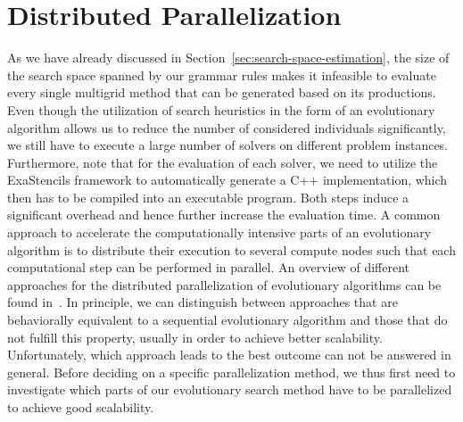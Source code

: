 \section{Distributed Parallelization}
\label{sec:distributed-parallelization}
As we have already discussed in Section~\ref{sec:search-space-estimation}, the size of the search space spanned by our grammar rules makes it infeasible to evaluate every single multigrid method that can be generated based on its productions.
Even though the utilization of search heuristics in the form of an evolutionary algorithm allows us to reduce the number of considered individuals significantly, we still have to execute a large number of solvers on different problem instances.
Furthermore, note that for the evaluation of each solver, we need to utilize the ExaStencils framework to automatically generate a C++ implementation, which then has to be compiled into an executable program.
Both steps induce a significant overhead and hence further increase the evaluation time.
A common approach to accelerate the computationally intensive parts of an evolutionary algorithm is to distribute their execution to several compute nodes such that each computational step can be performed in parallel.
An overview of different approaches for the distributed parallelization of evolutionary algorithms can be found in~\cite{gong2015distributed}.
In principle, we can distinguish between approaches that are behaviorally equivalent to a sequential evolutionary algorithm and those that do not fulfill this property, usually in order to achieve better scalability.
Unfortunately, which approach leads to the best outcome can not be answered in general.
Before deciding on a specific parallelization method, we thus first need to investigate which parts of our evolutionary search method have to be parallelized to achieve good scalability.

